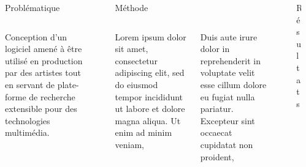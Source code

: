\begin{columns}[t]
   \begin{column}{\sepwid}\end{column}
     \begin{column}{\onecolwid}
      \begin{block}{Problématique}
          \begin{columns}[t]
              \begin{column}{\onecolwid}\justify
                  Conception d'un logiciel amené à être utilisé en production par des artistes tout en servant de plate-forme de recherche extensible pour des technologies multimédia.
                \end{column}
            \end{columns}        
      \end{block}
     \end{column}
     \begin{column}{\sepwid}\end{column}
     \begin{column}{\twocolwid}
         \begin{block}{Méthode}             
             \begin{columns}[t]	                 
                 \begin{column}{\onecolwid}\justify
                     Lorem ipsum dolor sit amet, consectetur adipiscing elit, sed do eiusmod tempor incididunt ut labore et dolore magna aliqua. Ut enim ad minim veniam, 
                     \end{column}
                     \begin{column}{\onecolwid}\justify
                         Duis aute irure dolor in reprehenderit in voluptate velit esse cillum dolore eu fugiat nulla pariatur. Excepteur sint occaecat cupidatat non proident, 
                        \end{column}
                \end{columns}                 
            \end{block}
      \end{column}
      \begin{column}{\sepwid}\end{column}
      \begin{column}{\onecolwid}
          \begin{block}{Résultats}
          	\begin{columns}[t]
          		\begin{column}{\onecolwid}\justify

\end{column}
\end{columns}
\end{block}
\end{column}
\end{columns}
